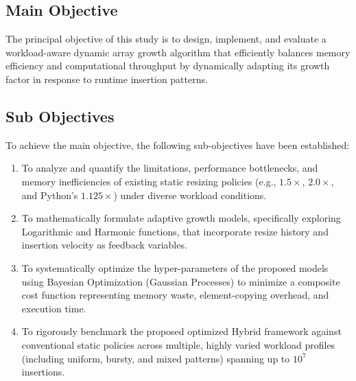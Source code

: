 \subsection{Main Objective}
The principal objective of this study is to design, implement, and evaluate a 
workload-aware dynamic array growth algorithm that efficiently balances memory 
efficiency and computational throughput by dynamically adapting its growth 
factor in response to runtime insertion patterns.

\subsection{Sub Objectives}
To achieve the main objective, the following sub-objectives have been established:
\begin{enumerate}
    \item To analyze and quantify the limitations, performance bottlenecks, and 
    memory inefficiencies of existing static resizing policies (e.g., $1.5\times$, 
    $2.0\times$, and Python's $1.125\times$) under diverse workload conditions.
    \item To mathematically formulate adaptive growth models, specifically 
    exploring Logarithmic and Harmonic functions, that incorporate resize history 
    and insertion velocity as feedback variables.
    \item To systematically optimize the hyper-parameters of the proposed models 
    using Bayesian Optimization (Gaussian Processes) to minimize a composite cost 
    function representing memory waste, element-copying overhead, and execution 
    time.
    \item To rigorously benchmark the proposed optimized Hybrid framework against 
    conventional static policies across multiple, highly varied workload profiles 
    (including uniform, bursty, and mixed patterns) spanning up to $10^7$ insertions.
\end{enumerate}

